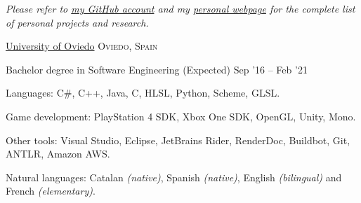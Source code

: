 \documentclass[10pt,a4paper]{article} %
\begin{document}

\begin{center}
\textit{Please refer to \href{https://github.com/pacojq}{my GitHub account} and my \href{http://pacojq.github.io}{personal webpage} for the complete list of personal projects and research.}
\end{center}


\spacedhrule{-0.2em}{-0.4em} %




\headedsection %
{\href{http://www.uniovi.es/en/inicio}{University of Oviedo}}
{\textsc{Oviedo, Spain}} {

\headedsubsection %
{Bachelor degree in Software Engineering}
{(Expected) Sep '16 -- Feb '21}
{}

}

\spacedhrule{0.5em}{-0.4em} %



\inlineheadsection %
{Languages:}
{C\#, C++, Java, C, HLSL, Python, Scheme, GLSL.}


\inlineheadsection %
{Game development:}
{PlayStation 4 SDK, Xbox One SDK, OpenGL, Unity, Mono.}


\inlineheadsection %
{Other tools:}
{Visual Studio, Eclipse, JetBrains Rider, RenderDoc, Buildbot, Git, ANTLR, Amazon AWS.}


\inlineheadsection %
{Natural languages:}
{Catalan \textit{(native)}, Spanish \textit{(native)}, English \textit{(bilingual)} and French \textit{(elementary)}.}

\end{document}

